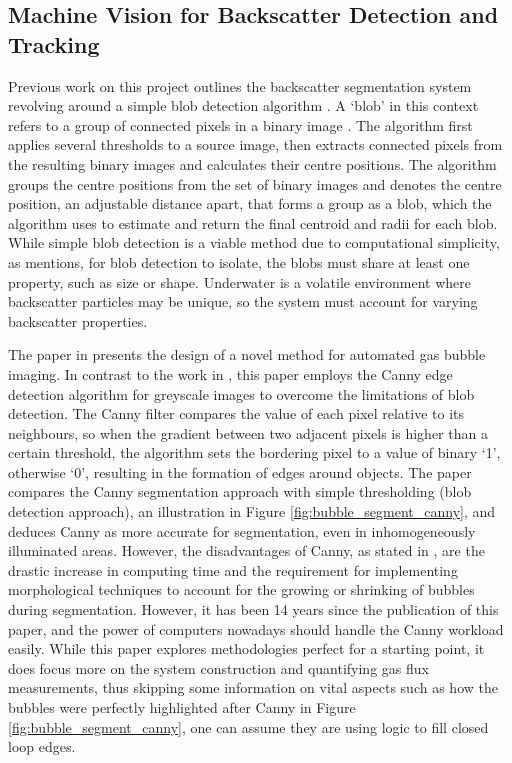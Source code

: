 \subsection{Machine Vision for Backscatter Detection and Tracking}
\label{bi_mv}
Previous work on this project \cite{katieshepherdMachineVisionBased2023} outlines the backscatter segmentation system revolving around a simple blob detection algorithm \cite{opencvOpenCVCvSimpleBlobDetector}. A `blob' in this context refers to a group of connected pixels in a binary image \cite{theodoreWhatExactlyBlob}. The algorithm first applies several thresholds to a source image, then extracts connected pixels from the resulting binary images and calculates their centre positions. The algorithm groups the centre positions from the set of binary images and denotes the centre position, an adjustable distance apart, that forms a group as a blob, which the algorithm uses to estimate and return the final centroid and radii for each blob. While simple blob detection is a viable method due to computational simplicity, as \cite{katieshepherdMachineVisionBased2023} mentions, for blob detection to isolate, the blobs must share at least one property, such as size or shape. Underwater is a volatile environment where backscatter particles may be unique, so the system must account for varying backscatter properties.

The paper in \cite{thomanekAutomatedGasBubble2010} presents the design of a novel method for automated gas bubble imaging. In contrast to the work in \cite{katieshepherdMachineVisionBased2023}, this paper employs the Canny edge detection algorithm \cite{cannyComputationalApproachEdge1986} for greyscale images to overcome the limitations of blob detection. The Canny filter compares the value of each pixel relative to its neighbours, so when the gradient between two adjacent pixels is higher than a certain threshold, the algorithm sets the bordering pixel to a value of binary `1', otherwise `0', resulting in the formation of edges around objects. The paper compares the Canny segmentation approach with simple thresholding (blob detection approach), an illustration in Figure \ref{fig:bubble_segment_canny}, and deduces Canny as more accurate for segmentation, even in inhomogeneously illuminated areas. However, the disadvantages of Canny, as stated in \cite{thomanekAutomatedGasBubble2010}, are the drastic increase in computing time and the requirement for implementing morphological techniques to account for the growing or shrinking of bubbles during segmentation. However, it has been 14 years since the publication of this paper, and the power of computers nowadays should handle the Canny workload easily. While this paper explores methodologies perfect for a starting point, it does focus more on the system construction and quantifying gas flux measurements, thus skipping some information on vital aspects such as how the bubbles were perfectly highlighted after Canny in Figure \ref{fig:bubble_segment_canny}, one can assume they are using logic to fill closed loop edges.

